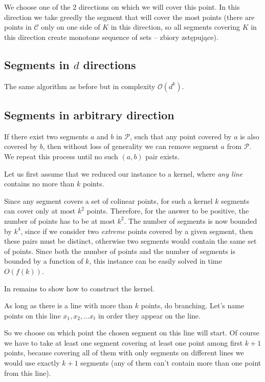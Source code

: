 \documentclass[en]{pracamgr}
\newcommand{\points}{\mathcal{C}}
\newcommand{\sets}{\mathcal{P}}
\begin{document}
We choose one of the 2 directions on which we will cover this point.
In this direction we take greedly the segment that will cover
the most points (there are points in $\points$ only on
one side of $K$ in this direction, so all
segments covering $K$ in this direction create monotone sequence
of sets -- zbiory zstępujące).

\subsection{Segments in $d$ directions}
The same algorithm as before but in complexity $\mathcal{O}(d^k)$.

\subsection{Segments in arbitrary direction}
If there exist two segments $a$ and $b$ in $\sets$,
such that any point covered by $a$ is also covered by $b$,
then without loss of generality we can remove segment $a$ from $\sets$.
We repeat this process until no such $(a, b)$ pair exists.


Let us first assume that we reduced our instance to a kernel,
where \textit{any line} contains no more than $k$ points.

Since any segment covers a set of colinear points,
for such a kernel $k$ segments can cover only at most $k^2$ points.
Therefore, for the answer to be positive,
the number of points has to be at most $k^2$.
The number of segments is now bounded by $k^4$,
since if we consider two \textit{extreme} points
covered by a given segment,
then these pairs must be distinct,
otherwise two segments would contain the same set of points.
Since both the number of points and the number of segments
is bounded by a function of $k$,
this instance can be easily solved in time $O(f(k))$.

In remains to show how to construct the kernel.

As long as there is a line with more than $k$ points, do branching.
Let's name points on this line $x_1, x_2, \ldots x_t$
in order they appear on the line.

So we choose on which point the chosen segment on this line
will start. Of course we have to take at least one segment
covering at least one point among first $k+1$ points,
because covering all of them with only segments
on different lines we would use
exactly $k+1$ segments (any of them can't contain more than
one point from this line).
\end{document}
